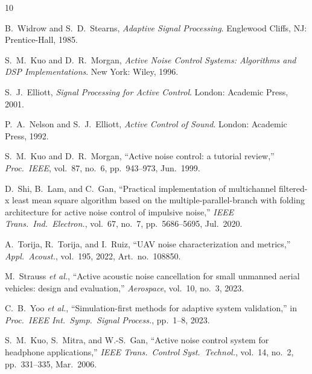 \documentclass[journal,12pt,onecolumn]{IEEEtran}
\begin{document}

\begin{thebibliography}{10}

B.~Widrow and S.~D.~Stearns,
\emph{Adaptive Signal Processing}.
Englewood Cliffs, NJ: Prentice-Hall, 1985.

S.~M.~Kuo and D.~R.~Morgan,
\emph{Active Noise Control Systems: Algorithms and DSP Implementations}.
New York: Wiley, 1996.

S.~J.~Elliott,
\emph{Signal Processing for Active Control}.
London: Academic Press, 2001.

P.~A.~Nelson and S.~J.~Elliott,
\emph{Active Control of Sound}.
London: Academic Press, 1992.

S.~M.~Kuo and D.~R.~Morgan,
``Active noise control: a tutorial review,''
\emph{Proc.\ IEEE}, vol.~87, no.~6, pp.~943--973, Jun.\ 1999.

D.~Shi, B.~Lam, and C.~Gan,
``Practical implementation of multichannel filtered-x least mean square
algorithm based on the multiple-parallel-branch with folding architecture
for active noise control of impulsive noise,''
\emph{IEEE Trans.\ Ind.\ Electron.}, vol.~67, no.~7,
pp.~5686--5695, Jul.\ 2020.

A.~Torija, R.~Torija, and I.~Ruiz,
``UAV noise characterization and metrics,''
\emph{Appl.\ Acoust.}, vol.~195, 2022, Art.\ no.~108850.

M.~Strauss \emph{et al.},
``Active acoustic noise cancellation for small unmanned aerial vehicles:
design and evaluation,''
\emph{Aerospace}, vol.~10, no.~3, 2023.

C.~B.~Yoo \emph{et al.},
``Simulation-first methods for adaptive system validation,''
in \emph{Proc.\ IEEE Int.\ Symp.\ Signal Process.}, pp.~1--8, 2023.

S.~M.~Kuo, S.~Mitra, and W.-S.~Gan,
``Active noise control system for headphone applications,''
\emph{IEEE Trans.\ Control Syst.\ Technol.}, vol.~14, no.~2,
pp.~331--335, Mar.\ 2006.

\end{thebibliography}
\end{document}
